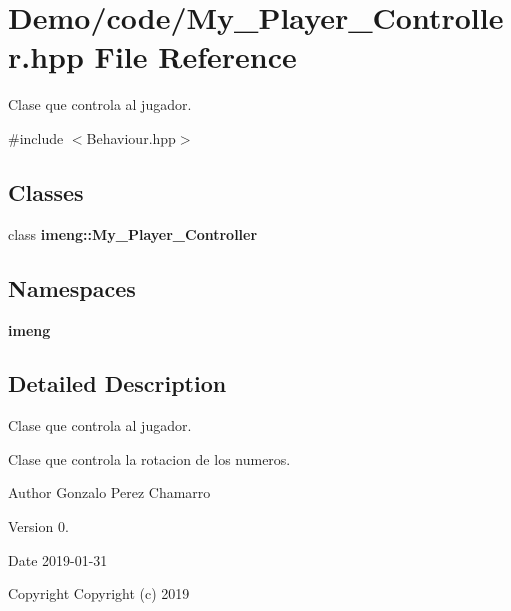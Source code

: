 \section{Demo/code/\+My\+\_\+\+Player\+\_\+\+Controller.hpp File Reference}
\label{_my___player___controller_8hpp}


Clase que controla al jugador.  


{\ttfamily \#include $<$Behaviour.\+hpp$>$}\newline
\subsection*{Classes}
\begin{DoxyCompactItemize}
\item 
class \textbf{ imeng\+::\+My\+\_\+\+Player\+\_\+\+Controller}
\end{DoxyCompactItemize}
\subsection*{Namespaces}
\begin{DoxyCompactItemize}
\item 
 \textbf{ imeng}
\end{DoxyCompactItemize}


\subsection{Detailed Description}
Clase que controla al jugador. 

Clase que controla la rotacion de los numeros.

\begin{DoxyAuthor}{Author}
Gonzalo Perez Chamarro 
\end{DoxyAuthor}
\begin{DoxyVersion}{Version}
0. 
\end{DoxyVersion}
\begin{DoxyDate}{Date}
2019-\/01-\/31
\end{DoxyDate}
\begin{DoxyCopyright}{Copyright}
Copyright (c) 2019 
\end{DoxyCopyright}

